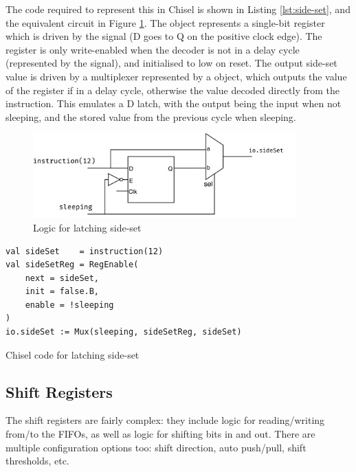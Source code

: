 The code required to represent this in Chisel is shown in Listing \ref{lst:side-set}, and the equivalent circuit in Figure \ref{fig:side-set}. The  object represents a single-bit register which is driven by the  signal (D goes to Q on the positive clock edge). The register is only write-enabled when the decoder is not in a delay cycle (represented by the  signal), and initialised to low on reset. The output side-set value  is driven by a multiplexer represented by a  object, which outputs the value of the register if in a delay cycle, otherwise the value decoded directly from the instruction. This emulates a D latch, with the output being the input when not sleeping, and the stored value from the previous cycle when sleeping.

\begin{figure}[H]
    \centering
    \includegraphics[width=0.9\textwidth]{../img/side-set.png}
    \caption{Logic for latching side-set}
    \label{fig:side-set}
\end{figure}

\begin{listing}[h!]
    \vspace{0.5cm}
    \begin{verbatim}
val sideSet    = instruction(12)
val sideSetReg = RegEnable(
    next = sideSet, 
    init = false.B, 
    enable = !sleeping
)
io.sideSet := Mux(sleeping, sideSetReg, sideSet)
    \end{verbatim}
    \caption{Chisel code for latching side-set}
    \label{lst:side-set}
\end{listing}



\subsection{Shift Registers}

The shift registers are fairly complex: they include logic for reading/writing from/to the FIFOs, as well as logic for shifting bits in and out. There are multiple configuration options too: shift direction, auto push/pull, shift thresholds, etc.


